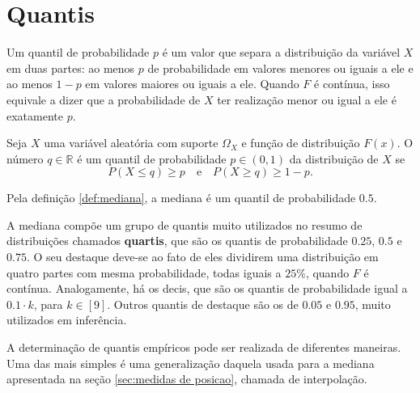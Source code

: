 \section{Quantis}

Um quantil de probabilidade $p$ é um valor que separa a distribuição da variável $X$
em duas partes: ao menos $p$ de probabilidade em valores menores ou iguais a ele e ao
menos $1 - p$ em valores maiores ou iguais a ele.
Quando $F$ é contínua, isso equivale a dizer que a probabilidade de $X$ ter realização
menor ou igual a ele é exatamente $p$.

\begin{def:quantil}
Seja $X$ uma variável aleatória com suporte $\Omega_X$ e função de distribuição $F(x)$.
O número $q \in \mathbb{R}$ é um quantil de probabilidade $p \in (0, 1)$ da distribuição
de $X$ se
\[
    P(X \le q) \ge p \quad \text{e} \quad P(X \ge q) \ge 1 - p.
\]
\end{def:quantil}

\begin{obs:mediana}
Pela definição \ref{def:mediana}, a mediana é um quantil de probabilidade $0.5$.
\end{obs:mediana}

A mediana compõe um grupo de quantis muito utilizados no resumo de distribuições
chamados \textbf{quartis}, que são os quantis de probabilidade $0.25$, $0.5$ e $0.75$.
O seu destaque deve-se ao fato de eles dividirem uma distribuição em quatro partes com
mesma probabilidade, todas iguais a $25\%$, quando $F$ é contínua.
Analogamente, há os decis, que são os quantis de probabilidade igual a $0.1 \cdot k$, para
$k \in [9]$.
Outros quantis de destaque são os de $0.05$ e $0.95$, muito utilizados em inferência.

A determinação de quantis empíricos pode ser realizada de diferentes maneiras.
Uma das mais simples é uma generalização daquela usada para a mediana apresentada na
seção \ref{sec:medidas de posicao}, chamada de interpolação.

